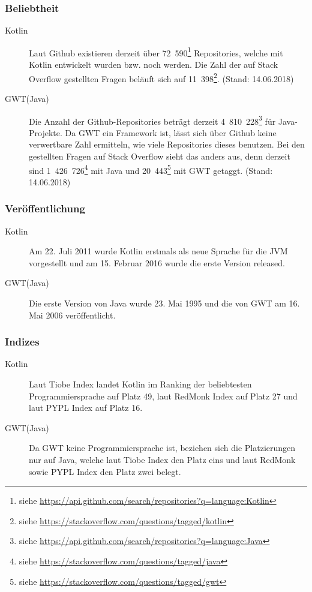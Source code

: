\subsubsection{Beliebtheit}
\begin{description}
	\item[Kotlin] Laut Github existieren derzeit über 72~590\footnote{siehe \url{https://api.github.com/search/repositories?q=language:Kotlin}} Repositories, welche mit Kotlin entwickelt wurden bzw. noch werden. Die Zahl der auf Stack Overflow gestellten Fragen beläuft sich auf 11~398\footnote{siehe \url{https://stackoverflow.com/questions/tagged/kotlin}}. (Stand: 14.06.2018)
	\item[GWT(Java)] Die Anzahl der Github-Repositories beträgt derzeit 4~810~228\footnote{siehe \url{https://api.github.com/search/repositories?q=language:Java}} für Java-Projekte. Da \gls{GWT} ein Framework ist, lässt sich über Github keine verwertbare Zahl ermitteln, wie viele Repositories dieses benutzen. Bei den gestellten Fragen auf Stack Overflow sieht das anders aus, denn derzeit sind 1~426~726\footnote{siehe \url{https://stackoverflow.com/questions/tagged/java}} mit Java und 20~443\footnote{siehe \url{https://stackoverflow.com/questions/tagged/gwt}} mit \gls{GWT} getaggt. (Stand: 14.06.2018)
\end{description}

\subsubsection{Veröffentlichung}
\begin{description}
	\item[Kotlin] Am 22. Juli 2011 wurde Kotlin erstmals als neue Sprache für die \gls{JVM} vorgestellt und am 15. Februar 2016 wurde die erste Version released. \cite{kotlinNewForJVM, kotlinRelease}
	\item[GWT(Java)] Die erste Version von Java wurde 23. Mai 1995 und die von \gls{GWT} am 16. Mai 2006 veröffentlicht. \cite{javaRelease, gwtRelease}
\end{description}

\subsubsection{Indizes}
\begin{description}
	\item[Kotlin] Laut Tiobe Index landet Kotlin im Ranking der beliebtesten Programmiersprache auf Platz 49, laut RedMonk Index auf Platz 27 und laut PYPL Index auf Platz 16. \cite{tiobeIndex, redMonkIndex, pyplIndex}
	\item[GWT(Java)] Da \gls{GWT} keine Programmiersprache ist, beziehen sich die Platzierungen nur auf Java, welche laut Tiobe Index den Platz eins und laut RedMonk sowie PYPL Index den Platz zwei belegt. \cite{tiobeIndex, redMonkIndex, pyplIndex}
\end{description}


